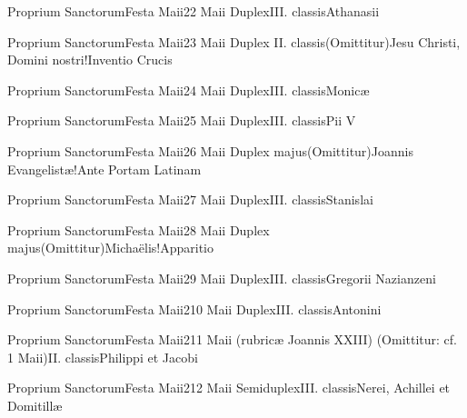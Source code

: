 \documentclass[invitatoriale-romanum.tex]{subfiles}
\begin{document}
	{Proprium Sanctorum}{Festa Maii}{2}{2 Maii}
	{Duplex}{III. classis}{Athanasii}
	{}
	{}

	{Proprium Sanctorum}{Festa Maii}{2}{3 Maii}
	{Duplex II. classis}{(Omittitur)}{Jesu Christi, Domini nostri!Inventio Crucis}
	{}
	{\invitferia}

	{Proprium Sanctorum}{Festa Maii}{2}{4 Maii}
	{Duplex}{III. classis}{Monicæ}
	{}
	{}

	{Proprium Sanctorum}{Festa Maii}{2}{5 Maii}
	{Duplex}{III. classis}{Pii V}
	{}
	{}

	{Proprium Sanctorum}{Festa Maii}{2}{6 Maii}
	{Duplex majus}{(Omittitur)}{Joannis Evangelistæ!Ante Portam Latinam}
	{}
	{\invitferia}

	{Proprium Sanctorum}{Festa Maii}{2}{7 Maii}
	{Duplex}{III. classis}{Stanislai}
	{}
	{}

\newpage

	{Proprium Sanctorum}{Festa Maii}{2}{8 Maii}
	{Duplex majus}{(Omittitur)}{Michaëlis!Apparitio}
	{}
	{\invitferia}

	{Proprium Sanctorum}{Festa Maii}{2}{9 Maii}
	{Duplex}{III. classis}{Gregorii Nazianzeni}
	{}
	{}

	{Proprium Sanctorum}{Festa Maii}{2}{10 Maii}
	{Duplex}{III. classis}{Antonini}
	{}
	{}

	{Proprium Sanctorum}{Festa Maii}{2}{11 Maii (rubricæ Joannis XXIII)}
	{(Omittitur: cf. 1 Maii)}{II. classis}{Philippi et Jacobi}
	{\invitferia}
	{}

	{Proprium Sanctorum}{Festa Maii}{2}{12 Maii}
	{Semiduplex}{III. classis}{Nerei, Achillei et Domitillæ}
	{}
	{}
\end{document}
